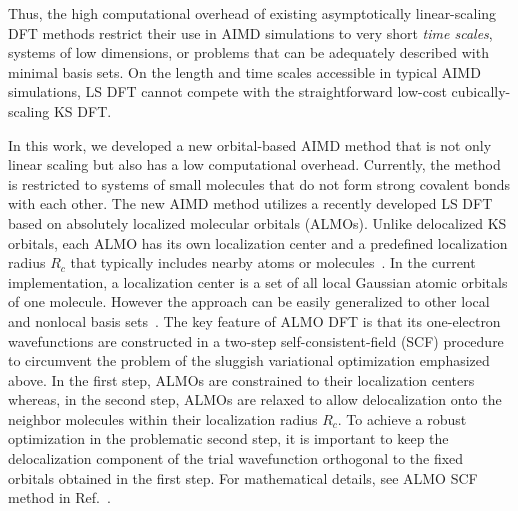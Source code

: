 \documentclass[aps,prl,reprint,amsmath,amssymb]{revtex4-1}
\begin{document}

Thus, the high computational overhead of existing asymptotically linear-scaling DFT methods restrict their use in AIMD simulations to very short \emph{time scales}, systems of low dimensions, or problems that can be adequately described with minimal basis sets. 
On the length and time scales accessible in typical AIMD simulations, LS DFT cannot compete with the straightforward low-cost cubically-scaling KS DFT.

In this work, we developed a new orbital-based AIMD method that is not only linear scaling but also has a low computational overhead. 
Currently, the method is restricted to systems of small molecules that do not form strong covalent bonds with each other. 
The new AIMD method utilizes a recently developed LS DFT~\cite{a:almo-ls} based on absolutely localized molecular orbitals (\mbox{ALMOs}). 
Unlike delocalized KS orbitals, each \mbox{ALMO} has its own localization center and a predefined localization radius $R_{c}$ that typically includes nearby atoms or molecules~\cite{a:stoll,a:almo-ls}. 
In the current implementation, a localization center is a set of all local Gaussian atomic orbitals of one molecule. 
However the approach can be easily generalized to other local and nonlocal basis sets~\cite{a:ls-galli-parrinello-1992, RZK:10.1016/j.jcp.2011.11.032}. 
The key feature of ALMO DFT is that its one-electron wavefunctions are constructed in a two-step self-consistent-field (SCF) procedure~\cite{a:almo-ls} to circumvent the problem of the sluggish variational optimization emphasized above. 
In the first step, ALMOs are constrained to their localization centers~\cite{a:khal} whereas, in the second step, ALMOs are relaxed to allow delocalization onto the neighbor molecules within their localization radius $R_{c}$. 
To achieve a robust optimization in the problematic second step, it is important to keep the delocalization component of the trial wavefunction orthogonal to the fixed orbitals obtained in the first step. 
For mathematical details, see ALMO SCF method in Ref.~.
\end{document}
